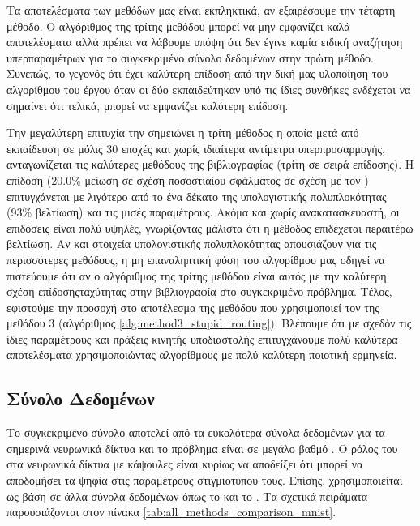 Τα αποτελέσματα των μεθόδων μας είναι εκπληκτικά, αν εξαιρέσουμε την τέταρτη μέθοδο. Ο αλγόριθμος  της τρίτης μεθόδου μπορεί να μην εμφανίζει καλά αποτελέσματα αλλά πρέπει να λάβουμε υπόψη ότι δεν έγινε καμία ειδική αναζήτηση υπερπαραμέτρων για το συγκεκριμένο σύνολο δεδομένων στην πρώτη μέθοδο. Συνεπώς, το γεγονός ότι έχει καλύτερη επίδοση από την δική μας υλοποίηση του αλγορίθμου του έργου \cite{sabour2017dynamic} όταν οι δύο εκπαιδεύτηκαν υπό τις ίδιες συνθήκες ενδέχεται να σημαίνει ότι τελικά, μπορεί να εμφανίζει καλύτερη επίδοση.\par

Την μεγαλύτερη επιτυχία την σημειώνει η τρίτη μέθοδος η οποία μετά από εκπαίδευση σε μόλις 30 εποχές και χωρίς ιδιαίτερα αντίμετρα υπερπροσαρμογής, ανταγωνίζεται τις καλύτερες μεθόδους της βιβλιογραφίας (τρίτη σε σειρά επίδοσης). Η επίδοση  (20.0\% μείωση σε σχέση ποσοστιαίου σφάλματος σε σχέση με τον ) επιτυγχάνεται με λιγότερο από το ένα δέκατο της υπολογιστικής πολυπλοκότητας (93\% βελτίωση) και τις μισές παραμέτρους. Ακόμα και χωρίς ανακατασκευαστή, οι επιδόσεις είναι πολύ υψηλές, γνωρίζοντας μάλιστα ότι η μέθοδος επιδέχεται περαιτέρω βελτίωση. Αν και στοιχεία υπολογιστικής πολυπλοκότητας απουσιάζουν για τις περισσότερες μεθόδους, η μη επαναληπτική φύση του αλγορίθμου μας οδηγεί να πιστεύουμε ότι αν ο αλγόριθμος  της τρίτης μεθόδου είναι αυτός με την καλύτερη σχέση επίδοσης\textendash ταχύτητας στην βιβλιογραφία στο συγκεκριμένο πρόβλημα. Τέλος, εφιστούμε την προσοχή στο αποτέλεσμα της μεθόδου  \cite{mazzia2021efficient} που χρησιμοποιεί τον  της μεθόδου 3 (αλγόριθμος \ref{alg:method3_stupid_routing}). Βλέπουμε ότι με σχεδόν τις ίδιες παραμέτρους και πράξεις κινητής υποδιαστολής επιτυγχάνουμε πολύ καλύτερα αποτελέσματα χρησιμοποιώντας αλγορίθμους με πολύ καλύτερη ποιοτική ερμηνεία.

\subsection{Σύνολο Δεδομένων }

Το συγκεκριμένο σύνολο αποτελεί από τα ευκολότερα σύνολα δεδομένων για τα σημερινά νευρωνικά δίκτυα και το πρόβλημα είναι σε μεγάλο βαθμό . Ο ρόλος του στα νευρωνικά δίκτυα με κάψουλες είναι κυρίως να αποδείξει ότι μπορεί να αποδομήσει τα ψηφία στις παραμέτρους στιγμιοτύπου τους. Επίσης, χρησιμοποιείται ως βάση σε άλλα σύνολα δεδομένων όπως το  και το . Τα σχετικά πειράματα παρουσιάζονται στον πίνακα \ref{tab:all_methods_comparison_mnist}.

